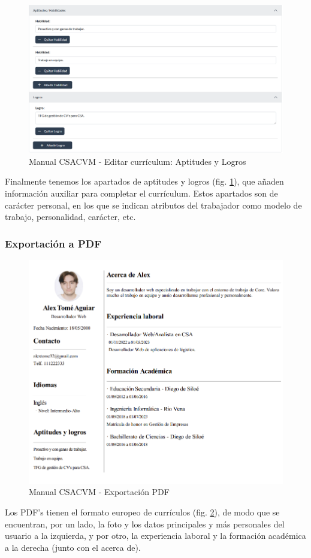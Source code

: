  
\begin{figure}
    \centering
    \includegraphics[width=\linewidth]{img/ManualUsuario/Manual16.png}
    \caption{Manual CSACVM - Editar currículum: Aptitudes y Logros} 
    \label{manualLogros}
\end{figure}
Finalmente tenemos los apartados de aptitudes y logros (fig. \ref{manualLogros}), que añaden información auxiliar para completar el currículum. Estos apartados son de carácter personal, en los que se indican atributos del trabajador como modelo de trabajo, personalidad, carácter, etc.

\subsubsection{Exportación a PDF}
\begin{figure}
    \centering
    \includegraphics[width=\linewidth]{img/ManualUsuario/Manual17.png}
    \caption{Manual CSACVM - Exportación PDF}
    \label{manualPDF}
\end{figure}
Los PDF's tienen el formato europeo de currículos (fig. \ref{manualPDF}), de modo que se encuentran, por un lado, la foto y los datos principales y más personales del usuario a la izquierda, y por otro, la experiencia laboral y la formación académica a la derecha (junto con el acerca de).

